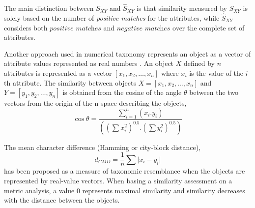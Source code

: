 The main distinction between $S_{XY}$ and $\hat{S}_{XY}$ is that similarity measured by $S_{XY}$ is solely based on the number of \textit{positive matches} for the attributes, while $\hat{S}_{XY}$ considers both $\textit{positive matches}$ and $\textit{negative matches}$ over the complete set of attributes.

Another approach used in numerical taxonomy represents an object as a vector of attribute values represented as real numbers \cite{B69}. An object $X$ defined by $n$ attributes is represented as a vector $[x_1, x_2, \dots, x_n]$ where $x_i$ is the value of the $i$th attribute. The similarity between objects $X=[x_1, x_2, \dots, x_n]$ and $Y=[y_1, y_2, \dots, y_n]$ is obtained from the cosine of the angle $\theta$ between the two vectors from the origin of the n-space describing the objects,
\begin{equation}\label{consine measurement}
\cos \theta = \frac{\sum_{i=1}^{n}(x_i.y_i)}{((\sum x_i^2)^{0.5}.(\sum y_i^2)^{0.5})}
\end{equation}

The mean character difference (Hamming or city-block distance),
\begin{equation}\label{Hamming distance}
d_{CMD} = \frac{1}{n}\sum \lvert x_i - y_i \rvert
\end{equation}
has been proposed as a measure of taxonomic resemblance \cite{JH58} when the objects are represented by real-value vectors. When basing a similarity assessment on a metric analysis, a value $0$ represents maximal similarity and similarity decreases with the distance between the objects.
